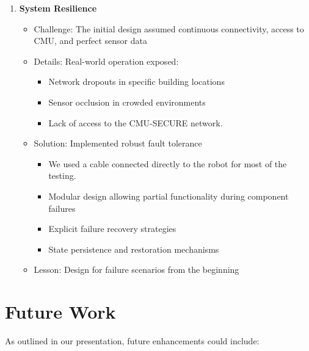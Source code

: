\documentclass[12pt]{article}
\begin{document}
\begin{enumerate}
    \item \textbf{System Resilience}
    \begin{itemize}
        \item Challenge: The initial design assumed continuous connectivity, access to CMU, and perfect sensor data
        \item Details: Real-world operation exposed:
        \begin{itemize}
            \item Network dropouts in specific building locations
            \item Sensor occlusion in crowded environments
            \item Lack of access to the CMU-SECURE network.
        \end{itemize}
        \item Solution: Implemented robust fault tolerance
        \begin{itemize}
            \item We used a cable connected directly to the robot for most of the testing.
            \item Modular design allowing partial functionality during component failures
            \item Explicit failure recovery strategies
            \item State persistence and restoration mechanisms
        \end{itemize}
        \item Lesson: Design for failure scenarios from the beginning
    \end{itemize}
\end{enumerate}

\section{Future Work}

As outlined in our presentation, future enhancements could include:
\end{document}
